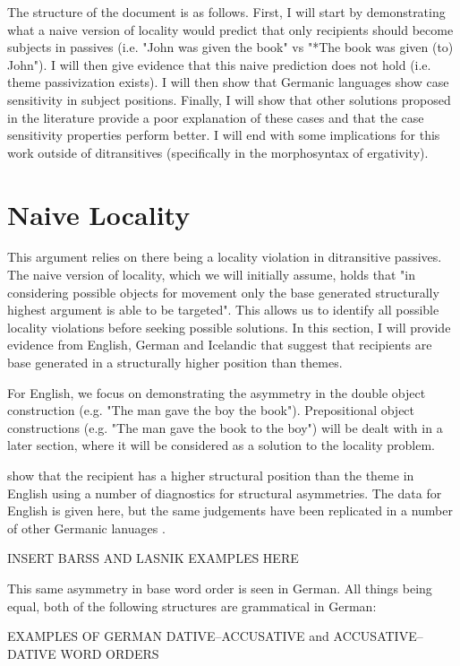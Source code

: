 The structure of the document is as follows. First, I will start by demonstrating what a naive version of locality would predict that only recipients should become subjects in passives (i.e. "John was given the book" vs "*The book was given (to) John"). I will then give evidence that this naive prediction does not hold (i.e. theme passivization exists). I will then show that Germanic languages show case sensitivity in subject positions. Finally, I will show that other solutions proposed in the literature provide a poor explanation of these cases and that the case sensitivity properties perform better. I will end with some implications for this work outside of ditransitives (specifically in the morphosyntax of ergativity).

\section{Naive Locality}
This argument relies on there being a locality violation in ditransitive passives. The naive version of locality, which we will initially assume, holds that "in considering possible objects for movement only the base generated structurally highest argument is able to be targeted". This allows us to identify all possible locality violations before seeking possible solutions. In this section, I will provide evidence from English, German and Icelandic that suggest that recipients are base generated in a structurally higher position than themes.

For English, we focus on demonstrating the asymmetry in the double object construction (e.g. "The man gave the boy the book"). Prepositional object constructions (e.g. "The man gave the book to the boy") will be dealt with in a later section, where it will be considered as a solution to the locality problem. 

\cite{Barss.1986} show that the recipient has a higher structural position than the theme in English using a number of diagnostics for structural asymmetries. The data for English is given here, but the same judgements have been replicated in a number of other Germanic lanuages \citep[AND OTHER CITATIONS TO BE ADDED]{Falk.1990}.
\bigskip

INSERT BARSS AND LASNIK EXAMPLES HERE
\bigskip

This same asymmetry in base word order is seen in German. All things being equal, both of the following structures are grammatical in German:
\bigskip

EXAMPLES OF GERMAN DATIVE--ACCUSATIVE and ACCUSATIVE--DATIVE WORD ORDERS
\bigskip

